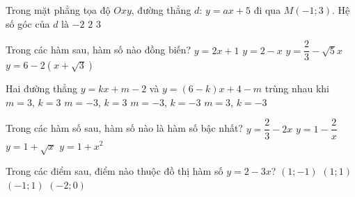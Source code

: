 \begin{bt}%
	Trong mặt phẳng tọa độ $Oxy$, đường thẳng $d$: $y=ax+5$ đi qua $M(-1;3)$. Hệ số góc của $d$ là
	{$-2$}
	{\True $2$}
	{$3$}
\end{bt}
\begin{bt}%
	Trong các hàm sau, hàm số nào đồng biến?
	\choice
	{\True $y=2x+1$}
	{$y=2-x$}
	{$y=\dfrac{2}{3}-\sqrt{5}x$}
	{$y=6-2(x+\sqrt{3})$}
\end{bt}
\begin{bt}%
	Hai đường thẳng $y=kx+m-2$ và $y=(6-k)x+4-m$ trùng nhau khi
	\choice
	{\True $m=3$, $k=3$}
	{$m=-3$, $k=3$}
	{$m=-3$, $k=-3$}
	{$m=3$, $k=-3$}
\end{bt}
\begin{bt}%
	Trong các hàm số sau, hàm số nào là hàm số bậc nhất?
	\choice
	{\True $y=\dfrac{2}{3}-2x$}
	{$y=1-\dfrac{2}{x}$}
	{$y=1+\sqrt{x}$}
	{$y=1+x^{2}$}
\end{bt}
\begin{bt}%
	Trong các điểm sau, điểm nào thuộc đồ thị hàm số $y=2-3x$?
	\choice
	{\True $(1;-1)$}
	{$(1;1)$}
	{$(-1;1)$}
	{$(-2;0)$}
\end{bt}
